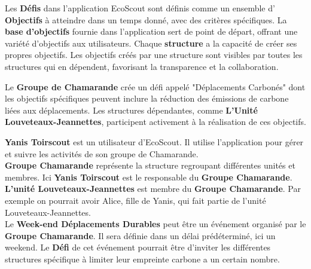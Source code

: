 Les \textbf{Défis} dans l'application EcoScout sont définis comme un ensemble d' \textbf{Objectifs} 
à atteindre dans un temps donné, avec des critères spécifiques. La \textbf{base d'objectifs} 
fournie dans l'application sert de point de départ, offrant une variété d'objectifs aux utilisateurs. 
Chaque \textbf{structure} a la capacité de créer ses propres objectifs. Les objectifs créés par une 
structure sont visibles par toutes les structures qui en dépendent, favorisant la transparence et la collaboration. 

\begin{tcolorbox}[colback=white!2,
    colframe=black!60,
    title=\textbf{Exemple de Défis}
   ]
   Le \textbf{Groupe de Chamarande} crée un défi appelé "Déplacements Carbonés" dont les objectifs spécifiques peuvent inclure la réduction des émissions de carbone 
   liées aux déplacements. Les structures dépendantes, comme \textbf{L'Unité Louveteaux-Jeannettes}, 
   participent activement à la réalisation de ces objectifs.
\end{tcolorbox}


\begin{tcolorbox}[colback=white!2,
    colframe=black!60,
    title=\textbf{Exemple d'utilisation}
   ]
   \textbf{Yanis Toirscout} est un utilisateur d'EcoScout. Il utilise l'application 
    pour gérer et suivre les activités de son groupe de Chamarande.\\
    \newline
    \textbf{Groupe Chamarande} représente la structure regroupant différentes 
    unités et membres. Ici \textbf{Yanis Toirscout} est le responsable du \textbf{Groupe Chamarande}.
    \textbf{L'unité Louveteaux-Jeannettes} est membre du \textbf{Groupe Chamarande}. 
    Par exemple on pourrait avoir Alice, fille de Yanis, qui fait partie de l'unité Louveteaux-Jeannettes.\\
    \newline
    Le \textbf{Week-end Déplacements Durables} peut être un événement organisé par le \textbf{Groupe Chamarande}.
    Il sera définie dans un délai prédéterminé, ici un weekend. Le \textbf{Défi} de cet événement pourrait être 
    d'inviter les différentes structures spécifique à limiter leur empreinte carbone a un certain nombre.
\end{tcolorbox}

